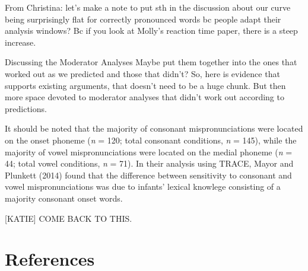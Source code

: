 \documentclass[man]{apa6}
\theoremstyle{definition}
\theoremstyle{definition}
\theoremstyle{definition}
\theoremstyle{remark}
\begin{document}
From Christina: let's make a note to put sth in the discussion about our
curve being surprisingly flat for correctly pronounced words bc people
adapt their analysis windows? Bc if you look at Molly's reaction time
paper, there is a steep increase.

Discussing the Moderator Analyses Maybe put them together into the ones
that worked out as we predicted and those that didn't? So, here is
evidence that supports existing arguments, that doesn't need to be a
huge chunk. But then more space devoted to moderator analyses that
didn't work out according to predictions.

It should be noted that the majority of consonant mispronunciations were
located on the onset phoneme (\emph{n} = 120; total consonant
conditions, \emph{n} = 145), while the majority of vowel
mispronunciations were located on the medial phoneme (\emph{n} = 44;
total vowel conditions, \emph{n} = 71). In their analysis using TRACE,
Mayor and Plunkett (2014) found that the difference between sensitivity
to consonant and vowel mispronunciations was due to infants' lexical
knowlege consisting of a majority consonant onset words.

{[}KATIE{]} COME BACK TO THIS.

\newpage

\section{References}\label{references}

\begingroup
\setlength{\parindent}{-0.5in} \setlength{\leftskip}{0.5in}

\hypertarget{refs}{}

\endgroup
\end{document}
